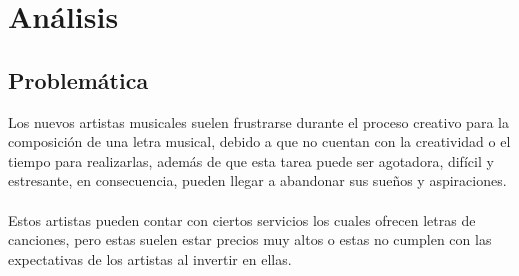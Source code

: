 \documentclass[12pt, a4paper, titlepage]{report}
\begin{document}

	\chapter{\textcolor{azulescom}{Análisis}}
	
	   \section{Problemática} %
	   Los nuevos artistas musicales suelen frustrarse durante el proceso creativo para la composición de una letra musical, debido a que no cuentan con la creatividad o el tiempo para realizarlas, además de que esta tarea puede ser agotadora, difícil y estresante, en consecuencia, pueden llegar a abandonar sus sueños y aspiraciones.\\\\
	   Estos artistas pueden contar con ciertos servicios los cuales ofrecen letras de canciones, pero estas suelen estar precios muy altos o estas no cumplen con las expectativas de los artistas al invertir en ellas.
	  
\end{document}
